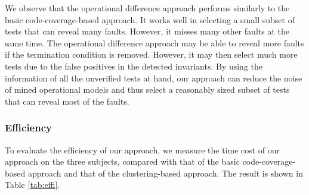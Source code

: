 \documentclass{sig-alternate}
\begin{document}
We observe that the operational difference approach performs
similarly to the basic code-coverage-based approach. It works well
in selecting a small subset of tests that can reveal many faults.
However, it misses many other faults at the same time. The
operational difference approach may be able to reveal more faults if
the termination condition is removed. However, it may then select
much more tests due to the false positives in the detected
invariants. By using the information of all the unverified tests at
hand, our approach can reduce the noise of mined operational models
and thus select a reasonably sized subset of tests that can reveal
most of the faults.



\vspace{-0.1in}

\subsubsection{Efficiency}



To evaluate the efficiency of our approach, we measure the time cost
of our approach on the three subjects, compared with that of the
basic code-coverage-based approach and that of the clustering-based
approach. The result is shown in Table \ref{tab:effi}.
\end{document}
